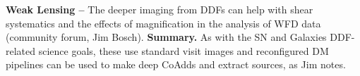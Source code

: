 \documentclass[DM,lsstdoc,toc]{lsstdoc}
\begin{document}
\noindent \textbf{Weak Lensing -- } The deeper imaging from DDFs can help with shear systematics and the effects of magnification in the analysis of WFD data (community forum, Jim Bosch). \textbf{Summary.} As with the SN and Galaxies DDF-related science goals, these use standard visit images and reconfigured DM pipelines can be used to make deep CoAdds and extract sources, as Jim notes.



%
\end{document}
